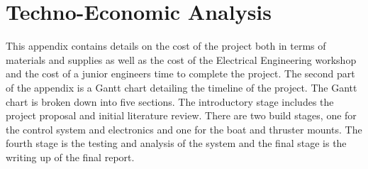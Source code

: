 
\chapter{Techno-Economic Analysis}
This appendix contains details on the cost of the project both in terms of materials and supplies as well as the cost of the Electrical Engineering workshop and the cost of a junior engineers time to complete the project. The second part of the appendix is a Gantt chart detailing the timeline of the project. The Gantt chart is broken down into five sections. The introductory stage includes the project proposal and initial literature review. There are two build stages, one for the control system and electronics and one for the boat and thruster mounts. The fourth stage is the testing and analysis of the system and the final stage is the writing up of the final report. \par
\newpage
